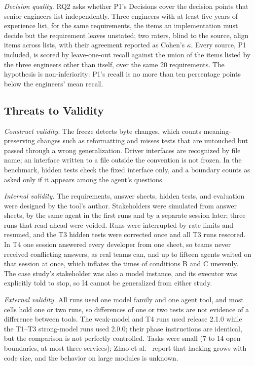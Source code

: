 \documentclass[conference]{IEEEtran}
\begin{document}
\emph{Decision quality.} RQ2 asks whether P1's Decisions cover the decision points that senior engineers list independently. Three engineers with at least five years of experience list, for the same requirements, the items an implementation must decide but the requirement leaves unstated; two raters, blind to the source, align items across lists, with their agreement reported as Cohen's $\kappa$. Every source, P1 included, is scored by leave-one-out recall against the union of the items listed by the three engineers other than itself, over the same 20 requirements. The hypothesis is non-inferiority: P1's recall is no more than ten percentage points below the engineers' mean recall.

\subsection{Threats to Validity}\label{sec:threats}

\emph{Construct validity.} The freeze detects byte changes, which counts meaning-preserving changes such as reformatting and misses tests that are untouched but passed through a wrong generalization. Driver interfaces are recognized by file name; an interface written to a file outside the convention is not frozen. In the benchmark, hidden tests check the fixed interface only, and a boundary counts as asked only if it appears among the agent's questions.

\emph{Internal validity.} The requirements, answer sheets, hidden tests, and evaluation were designed by the tool's author. Stakeholders were simulated from answer sheets, by the same agent in the first runs and by a separate session later; three runs that read ahead were voided. Runs were interrupted by rate limits and resumed, and the T3 hidden tests were corrected once and all T3 runs rescored. In T4 one session answered every developer from one sheet, so teams never received conflicting answers, as real teams can, and up to fifteen agents waited on that session at once, which inflates the times of conditions B and C unevenly. The case study's stakeholder was also a model instance, and its executor was explicitly told to stop, so I4 cannot be generalized from either study.

\emph{External validity.} All runs used one model family and one agent tool, and most cells hold one or two runs, so differences of one or two tests are not evidence of a difference between tools. The weak-model and T4 runs used release 2.1.0 while the T1--T3 strong-model runs used 2.0.0; their phase instructions are identical, but the comparison is not perfectly controlled. Tasks were small (7 to 14 open boundaries, at most three services); Zhao et al.~\cite{zhao2026specbench} report that hacking grows with code size, and the behavior on large modules is unknown.
\end{document}
